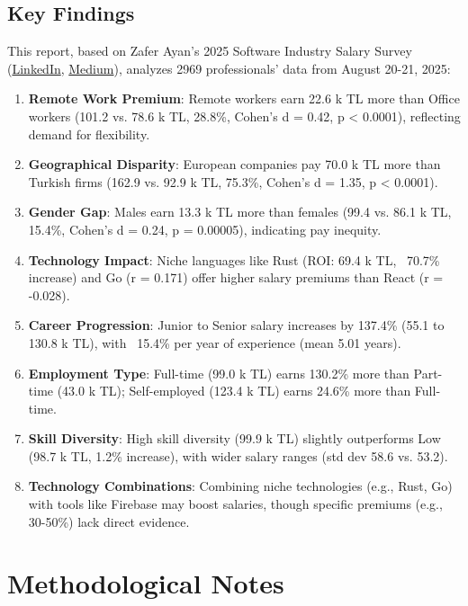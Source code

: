 \documentclass[12pt,a4paper]{article}
\begin{document}
\subsection{Key Findings}
This report, based on Zafer Ayan’s 2025 Software Industry Salary Survey (\href{https://www.linkedin.com/posts/zaferayan_geleneksel-maa%C5%9F-anketi-buyrun-httpslnkdin-activity-7363866008664629248-7YcQ}{LinkedIn}, \href{https://zaferayan.medium.com/2025-a%C4%9Fustos-detayl%C4%B1-maa%C5%9F-anketi-98446d71920a}{Medium}), analyzes 2969 professionals’ data from August 20-21, 2025:
	\begin{enumerate}
		\item \textbf{Remote Work Premium}: Remote workers earn 22.6 k TL more than Office workers (101.2 vs. 78.6 k TL, 28.8\%, Cohen’s d = 0.42, p < 0.0001), reflecting demand for flexibility.
		\item \textbf{Geographical Disparity}: European companies pay 70.0 k TL more than Turkish firms (162.9 vs. 92.9 k TL, 75.3\%, Cohen’s d = 1.35, p < 0.0001).
		\item \textbf{Gender Gap}: Males earn 13.3 k TL more than females (99.4 vs. 86.1 k TL, 15.4\%, Cohen’s d = 0.24, p = 0.00005), indicating pay inequity.
		\item \textbf{Technology Impact}: Niche languages like Rust (ROI: 69.4 k TL, ~70.7\% increase) and Go (r = 0.171) offer higher salary premiums than React (r = -0.028).
		\item \textbf{Career Progression}: Junior to Senior salary increases by 137.4\% (55.1 to 130.8 k TL), with ~15.4\% per year of experience (mean 5.01 years).
		\item \textbf{Employment Type}: Full-time (99.0 k TL) earns 130.2\% more than Part-time (43.0 k TL); Self-employed (123.4 k TL) earns 24.6\% more than Full-time.
		\item \textbf{Skill Diversity}: High skill diversity (99.9 k TL) slightly outperforms Low (98.7 k TL, 1.2\% increase), with wider salary ranges (std dev 58.6 vs. 53.2).
		\item \textbf{Technology Combinations}: Combining niche technologies (e.g., Rust, Go) with tools like Firebase may boost salaries, though specific premiums (e.g., 30-50\%) lack direct evidence.
	\end{enumerate}

    \section{Methodological Notes}
	
\end{document}
